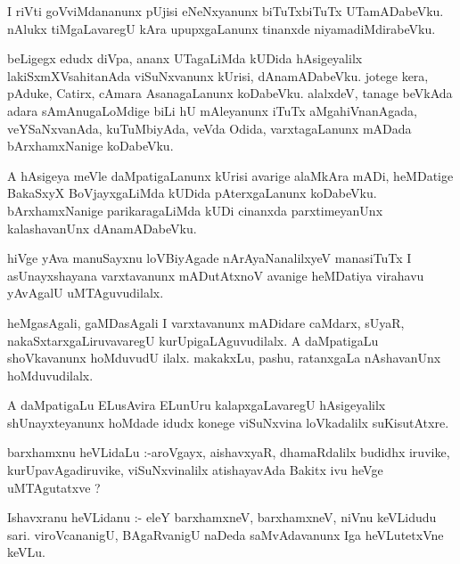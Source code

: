 \documentclass{article}
\begin{document}
\begin{mn}
I riVti  goVviMdananunx  pUjisi  eNeNxyanunx  biTuTxbiTuTx  UTamADabeVku.  nAlukx  tiMgaLavaregU  
kAra  upupxgaLanunx  tinanxde  niyamadiMdirabeVku.  
\end{mn}

\begin{mn}
beLigegx  edudx  diVpa,  ananx  UTagaLiMda  kUDida  hAsigeyalilx  lakiSxmXVsahitanAda  viSuNxvanunx  
kUrisi,  dAnamADabeVku.  jotege  kera,  pAduke,  Catirx,  cAmara  AsanagaLanunx  koDabeVku.  alalxdeV,  
tanage  beVkAda  adara  sAmAnugaLoMdige  biLi  hU  mAleyanunx  iTuTx  aMgahiVnanAgada,  veYSaNxvanAda,  
kuTuMbiyAda,  veVda  Odida,  varxtagaLanunx  mADada  bArxhamxNanige  koDabeVku.
\end{mn}

\begin{mn}
A  hAsigeya  meVle  daMpatigaLanunx  kUrisi  avarige  alaMkAra  mADi,  heMDatige  BakaSxyX  
BoVjayxgaLiMda  kUDida  pAterxgaLanunx  koDabeVku.  bArxhamxNanige  parikaragaLiMda  kUDi  
cinanxda  parxtimeyanUnx  kalashavanUnx  dAnamADabeVku.
\end{mn}

\begin{mn}
hiVge  yAva  manuSayxnu  loVBiyAgade  nArAyaNanalilxyeV  manasiTuTx  I  asUnayxshayana  varxtavanunx  
mADutAtxnoV  avanige  heMDatiya  virahavu  yAvAgalU  uMTAguvudilalx.
\end{mn}

\begin{mn}
heMgasAgali,  gaMDasAgali  I  varxtavanunx  mADidare  caMdarx,  sUyaR,  nakaSxtarxgaLiruvavaregU  kurUpigaLAguvudilalx.  
A  daMpatigaLu  shoVkavanunx  hoMduvudU  ilalx.  makakxLu,  pashu,  ratanxgaLa  nAshavanUnx  hoMduvudilalx.
\end{mn}

\begin{mn}
A  daMpatigaLu  ELusAvira  ELunUru  kalapxgaLavaregU  hAsigeyalilx  shUnayxteyanunx  hoMdade  idudx  konege  
viSuNxvina  loVkadalilx  suKisutAtxre.
\end{mn}

\begin{mn}
barxhamxnu  heVLidaLu :-aroVgayx,  aishavxyaR,  dhamaRdalilx  budidhx  iruvike,  kurUpavAgadiruvike,  
viSuNxvinalilx  atishayavAda  Bakitx  ivu  heVge  uMTAgutatxve ?
\end{mn}

\begin{mn}
Ishavxranu  heVLidanu :- eleY  barxhamxneV,  barxhamxneV,  niVnu  keVLidudu  sari.  viroVcananigU,  
BAgaRvanigU  naDeda  saMvAdavanunx  Iga  heVLutetxVne  keVLu. 
\end{mn}
\end{document}
